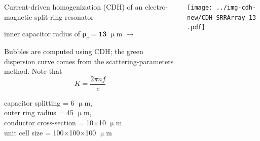 \documentclass[t]{beamer} \usepackage[english]{babel} \usepackage[utf8]{inputenc} \usetheme{Frankfurt} %
\begin{document}
\begin{frame}[plain]{}%
\begin{columns}[T] %
	\begin{column}{.55\textwidth}
	\vspace{3mm}
	\noindent Current-driven homogenization (CDH) of an electro-magnetic split-ring resonator 
	\begin{exampleblock}\hfill inner capacitor radius of $\pmb\rho_c=\pmb{13}\;\upmu$m $\rightarrow$\end{exampleblock}
	\vspace{3mm}

	\noindent Bubbles are computed using CDH; the green dispersion curve comes from the scattering-parameters method. Note that $$K = \frac{2\pi n f}{c}$$
	\vspace{12mm}

	\small{capacitor splitting = 6 $\upmu$m,\\ outer ring radius = 45 $\upmu$m,\\ conductor cross-section = 10$\times$10 $\upmu$m\\ unit cell size = 100$\times$100$\times$100 $\upmu$m}
	\vspace{5mm}

	\end{column}%
	\begin{column}{.45\textwidth}%
		\vspace{-1mm}\texttt{[image: ../img-cdh-new/CDH\_SRRArray\_13.pdf]} 
	\end{column}
\end{columns}
\end{frame} 		%
\end{document}
